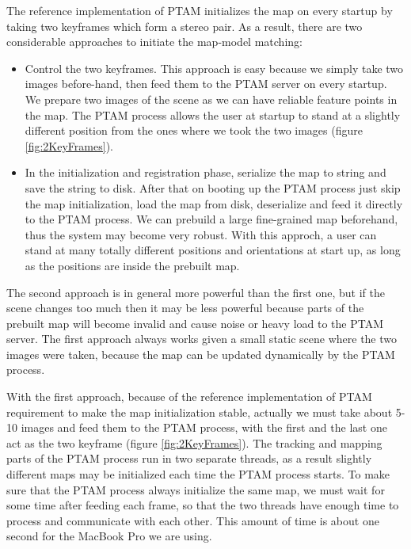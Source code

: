 The reference implementation of PTAM initializes the map on every startup by taking two keyframes which form a stereo pair. As a result, there are two considerable approaches to initiate the map-model matching:

\begin{itemize}
	\item Control the two keyframes. This approach is easy because we simply take two images before-hand, then feed them to the PTAM server on every startup. We prepare two images of the scene as we can have reliable feature points in the map. The PTAM process allows the user at startup to stand at a slightly different position from the ones where we took the two images (figure \ref{fig:2KeyFrames}).
	\item In the initialization and registration phase, serialize the map to string and save the string to disk. After that on booting up the PTAM process just skip the map initialization, load the map from disk, deserialize and feed it directly to the PTAM process. We can prebuild a large fine-grained map beforehand, thus the system may become very robust. With this approch, a user can stand at many totally different positions and orientations at start up, as long as the positions are inside the prebuilt map.
\end{itemize}

The second approach is in general more powerful than the first one, but if the scene changes too much then it may be less powerful because parts of the prebuilt map will become invalid and cause noise or heavy load to the PTAM server. The first approach always works given a small static scene where the two images were taken, because the map can be updated dynamically by the PTAM process.

With the first approach, because of the reference implementation of PTAM requirement to make the map initialization stable, actually we must take about 5-10 images and feed them to the PTAM process, with the first and the last one act as the two keyframe (figure \ref{fig:2KeyFrames}). The tracking and mapping parts of the PTAM process run in two separate threads, as a result slightly different maps may be initialized each time the PTAM process starts. To make sure that the PTAM process always initialize the same map, we must wait for some time after feeding each frame, so that the two threads have enough time to process and communicate with each other. This amount of time is about one second for the MacBook Pro we are using.

